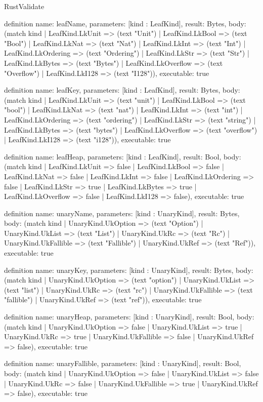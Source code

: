 \begin{lexlean}{RustValidate}
\begin{semanticmodule}
definition{
  name: leafName,
  parameters: [kind : LeafKind],
  result: Bytes,
  body: (match kind
    | LeafKind.LkUnit => (text "Unit")
    | LeafKind.LkBool => (text "Bool")
    | LeafKind.LkNat => (text "Nat")
    | LeafKind.LkInt => (text "Int")
    | LeafKind.LkOrdering => (text "Ordering")
    | LeafKind.LkStr => (text "Str")
    | LeafKind.LkBytes => (text "Bytes")
    | LeafKind.LkOverflow => (text "Overflow")
    | LeafKind.LkI128 => (text "I128")),
  executable: true
}

definition{
  name: leafKey,
  parameters: [kind : LeafKind],
  result: Bytes,
  body: (match kind
    | LeafKind.LkUnit => (text "unit")
    | LeafKind.LkBool => (text "bool")
    | LeafKind.LkNat => (text "nat")
    | LeafKind.LkInt => (text "int")
    | LeafKind.LkOrdering => (text "ordering")
    | LeafKind.LkStr => (text "string")
    | LeafKind.LkBytes => (text "bytes")
    | LeafKind.LkOverflow => (text "overflow")
    | LeafKind.LkI128 => (text "i128")),
  executable: true
}

definition{
  name: leafHeap,
  parameters: [kind : LeafKind],
  result: Bool,
  body: (match kind
    | LeafKind.LkUnit => false
    | LeafKind.LkBool => false
    | LeafKind.LkNat => false
    | LeafKind.LkInt => false
    | LeafKind.LkOrdering => false
    | LeafKind.LkStr => true
    | LeafKind.LkBytes => true
    | LeafKind.LkOverflow => false
    | LeafKind.LkI128 => false),
  executable: true
}

definition{
  name: unaryName,
  parameters: [kind : UnaryKind],
  result: Bytes,
  body: (match kind
    | UnaryKind.UkOption => (text "Option")
    | UnaryKind.UkList => (text "List")
    | UnaryKind.UkRc => (text "Rc")
    | UnaryKind.UkFallible => (text "Fallible")
    | UnaryKind.UkRef => (text "Ref")),
  executable: true
}

definition{
  name: unaryKey,
  parameters: [kind : UnaryKind],
  result: Bytes,
  body: (match kind
    | UnaryKind.UkOption => (text "option")
    | UnaryKind.UkList => (text "list")
    | UnaryKind.UkRc => (text "rc")
    | UnaryKind.UkFallible => (text "fallible")
    | UnaryKind.UkRef => (text "ref")),
  executable: true
}

definition{
  name: unaryHeap,
  parameters: [kind : UnaryKind],
  result: Bool,
  body: (match kind
    | UnaryKind.UkOption => false
    | UnaryKind.UkList => true
    | UnaryKind.UkRc => true
    | UnaryKind.UkFallible => false
    | UnaryKind.UkRef => false),
  executable: true
}

definition{
  name: unaryFallible,
  parameters: [kind : UnaryKind],
  result: Bool,
  body: (match kind
    | UnaryKind.UkOption => false
    | UnaryKind.UkList => false
    | UnaryKind.UkRc => false
    | UnaryKind.UkFallible => true
    | UnaryKind.UkRef => false),
  executable: true
}


\end{semanticmodule}
\end{lexlean}
